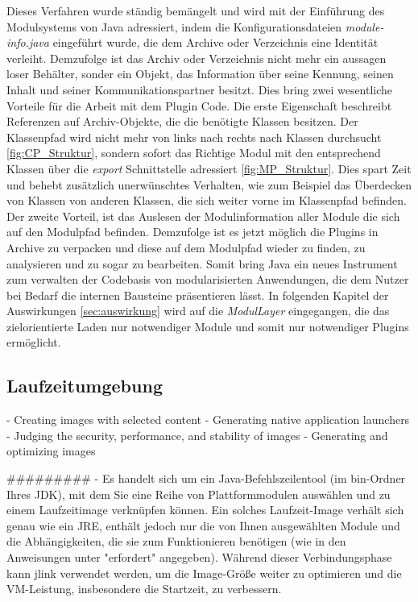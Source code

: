 		Dieses Verfahren wurde ständig bemängelt und wird mit der Einführung des Modulsystems von Java adressiert, indem die Konfigurationsdateien \textit{module-info.java} eingeführt wurde, die dem Archive oder Verzeichnis eine Identität verleiht. Demzufolge ist das Archiv oder Verzeichnis nicht mehr ein aussagen loser Behälter, sonder ein Objekt, das Information über seine Kennung, seinen Inhalt und seiner Kommunikationspartner besitzt.\newline{}
		Dies bring zwei wesentliche Vorteile für die Arbeit mit dem Plugin Code. Die erste Eigenschaft beschreibt Referenzen auf Archiv-Objekte, die die benötigte Klassen besitzen. Der Klassenpfad wird nicht mehr von links nach rechts nach Klassen durchsucht \ref{fig:CP_Struktur}, sondern sofort das Richtige Modul mit den entsprechend Klassen über die \textit{export} Schnittstelle adressiert \ref{fig:MP_Struktur}. Dies spart Zeit und behebt zusätzlich unerwünschtes Verhalten, wie zum Beispiel das Überdecken von Klassen von anderen Klassen, die sich weiter vorne im Klassenpfad befinden.\newline 
		Der zweite Vorteil, ist das Auslesen der Modulinformation aller Module die sich auf den Modulpfad befinden. Demzufolge ist es jetzt möglich die Plugins in Archive zu verpacken und diese auf dem Modulpfad wieder zu finden, zu analysieren und zu sogar zu bearbeiten. Somit bring Java ein neues Instrument zum verwalten der Codebasis von modularisierten Anwendungen, die dem Nutzer bei Bedarf die internen Bausteine präsentieren lässt.\newline
		In folgenden Kapitel der Auswirkungen \ref{sec:auswirkung} wird auf die \textit{ModulLayer} eingegangen, die das zielorientierte Laden nur notwendiger Module und somit nur notwendiger Plugins ermöglicht.

	\subsection{Laufzeitumgebung} \label{sub:laufzeit_images}
	- Creating images with selected content
	- Generating native application launchers
	- Judging the security, performance, and stability of images
	- Generating and optimizing images

#########
	- Es handelt sich um ein Java-Befehlszeilentool (im bin-Ordner Ihres JDK), mit dem Sie eine Reihe von Plattformmodulen auswählen und zu einem Laufzeitimage verknüpfen können. Ein solches Laufzeit-Image verhält sich genau wie ein JRE, enthält jedoch nur die von Ihnen ausgewählten Module und die Abhängigkeiten, die sie zum Funktionieren benötigen (wie in den Anweisungen unter "erfordert" angegeben). Während dieser Verbindungsphase kann jlink verwendet werden, um die Image-Größe weiter zu optimieren und die VM-Leistung, insbesondere die Startzeit, zu verbessern.

